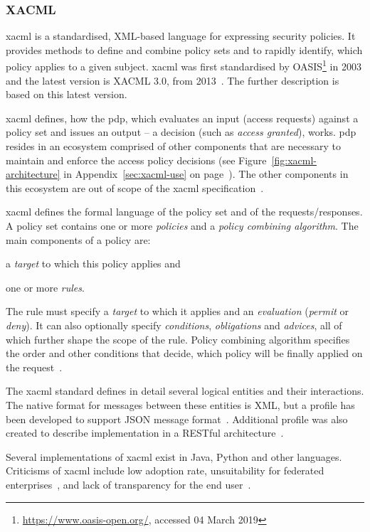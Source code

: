 \subsubsection{XACML}\label{sec:xacml}

 \acrfull{xacml} is a standardised, XML-based language for expressing security policies. It provides methods to define and combine policy sets and to rapidly identify, which policy applies to a given subject. \acrshort{xacml} was first standardised by OASIS\footnote{\url{https://www.oasis-open.org/}, accessed 04 March 2019} in 2003 and the latest version is XACML 3.0, from 2013~\cite{OASISStandard2013EXtensible3.0}. The further description is based on this latest version.
 
\acrshort{xacml} defines, how the \acrfull{pdp}, which evaluates an input (access requests) against a policy set and issues an output -- a decision (such as \textit{access granted}), works. \acrshort{pdp} resides in an ecosystem comprised of other components that are necessary to maintain and enforce the access policy decisions (see Figure~\ref{fig:xacml-architecture} in Appendix~\ref{sec:xacml-use} on page~\pageref{fig:xacml-architecture}). The other components in this ecosystem are out of scope of the \acrshort{xacml} specification~\cite{OASISStandard2013EXtensible3.0}.

\acrshort{xacml} defines the formal language of the policy set and of the requests/responses. A policy set contains one or more \textit{policies} and a \textit{policy combining algorithm}. The main components of a policy are:
% 
\begin{enumerate*}[label=(\roman*)]
    \item a \textit{target} to which this policy applies and
    \item one or more \textit{rules}.
\end{enumerate*} 
% 
The rule must specify a \textit{target} to which it applies and an \textit{evaluation} (\textit{permit} or \textit{deny}). It can also optionally specify \textit{conditions}, \textit{obligations} and \textit{advices}, all of which further shape the scope of the rule. Policy combining algorithm specifies the order and other conditions that decide, which policy will be finally applied on the request~\cite{OASISStandard2013EXtensible3.0}.
 
The \acrshort{xacml} standard defines in detail several logical entities and their interactions. The native format for messages between these entities is XML, but a profile has been developed to support JSON message format~\cite{2017JSON1.0}. Additional profile was also created to describe implementation in a RESTful architecture~\cite{2017REST1.0}.
 
 Several implementations of \acrshort{xacml} exist in Java, Python and other languages. Criticisms of \acrshort{xacml} include low adoption rate, unsuitability for federated enterprises~\cite{Cser2013XACMLDead}, and lack of transparency for the end user~\cite{Cser2013XACMLDead, Ardagna2011ExpressiveApplications}.

